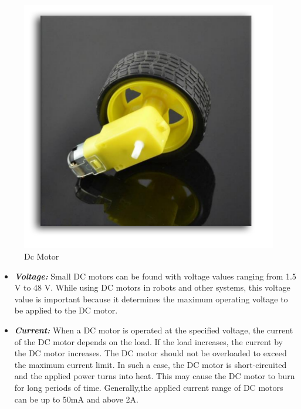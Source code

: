 \documentclass[11pt]{article}
\begin{document}
\begin{figure}[h]
\centering
\includegraphics[scale=0.4]{dcmotor.png}
\caption{Dc Motor}
\end{figure}
\pagebreak
\begin{itemize}
\item[] \textbf{\textit{Voltage:}} Small DC motors can be found with voltage values ranging from 1.5 V to 48 V. While using DC motors in robots and other systems, this voltage value is important because it determines the maximum operating voltage to be applied to the DC motor.

\item[] \textbf{\textit{Current:}} When a DC motor is operated at the specified voltage, the current of the DC motor depends on the load. If the load increases, the current by the DC motor increases. The DC motor should not be overloaded to exceed the maximum current limit. In such a case, the DC motor is short-circuited and the applied power turns into heat. This may cause the DC motor to burn for long periods of time. Generally,the applied current range of DC motors can be up to 50mA and above 2A.
\end{itemize}

\pagebreak
\end{document}
